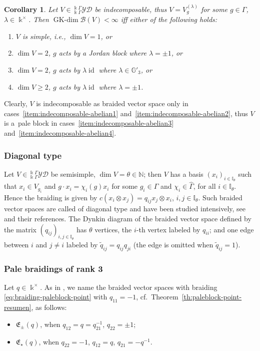 \documentclass[pdftex]{sigma}
\numberwithin{equation}{section}
\newtheorem{Corollary}[Theorem]{Corollary}
\newcommand{\GK}{\operatorname{GK-dim}}
\newcommand{\id}{\operatorname{id}}
\newcommand{\toba}{\mathscr B}
\newcommand{\G}{{\mathbb G}}
\newcommand{\I}{{\mathbb I}}
\newcommand{\N}{{\mathbb N}}
\newcommand{\eny}{\mathfrak{E}}
\newcommand{\yd}[1]{{}_{#1}^{#1}\mathcal{YD}}
\newcommand{\VGamma}{\widehat{\Gamma}}
\begin{document}
\begin{Corollary}\label{coro:indecomposable-abelian}
Let $V \in \yd{\Bbbk\Gamma}$ be indecomposable, thus $V = V_{g}^{(\lambda)}$
for some $g\in \Gamma$, $\lambda\in \Bbbk^{\times}$. Then $\GK\toba(V) <\infty$
iff either of the following holds:
\begin{enumerate}[label=$(\alph*)$]\itemsep=0pt
\item\label{item:indecomposable-abelian1} $V$ is simple, i.e., $\dim V = 1$, or

\item\label{item:indecomposable-abelian2} $\dim V = 2$, $g$ acts by a Jordan block where $\lambda = \pm 1$, or

\item\label{item:indecomposable-abelian3} $\dim V = 2$, $g$ acts by $\lambda \id$ where $\lambda \in \G'_3$, or

\item\label{item:indecomposable-abelian4} $\dim V \geq 2$, $g$ acts by $\lambda \id$ where $\lambda = \pm 1$.
\end{enumerate}
\end{Corollary}
Clearly, $V$ is indecomposable as braided vector space only in cases~\ref{item:indecomposable-abelian1}
and~\ref{item:indecomposable-abelian2}, thus $V$ is a~pale block in cases~\ref{item:indecomposable-abelian3}
and~\ref{item:indecomposable-abelian4}.

\subsubsection{Diagonal type}\label{subsec:diagonal-type} Let $V \in \yd{\Bbbk\Gamma}$ be semisimple, $\dim V = \theta \in \N$; then
$V$ has a basis $(x_i)_{i\in \I_{\theta}}$ such that $x_i\in V_{g_i}$ and $g\cdot x_i = \chi_i(g) x_i$ for some $g_i\in \Gamma$
and $\chi_i\in \VGamma$, for all $i\in \I_{\theta}$. Hence the braiding is given by $c(x_i\otimes x_j) = q_{ij} x_j \otimes x_i$,
$i, j\in \I_{\theta}$. Such braided vector spaces are called of diagonal type and have been studied intensively, see
\cite{A-leyva,AA-diag-survey,AS,H-classif-RS} and their references.
The Dynkin diagram of the braided vector space defined by the matrix $(q_{ij})_{i, j\in \I_{\theta}}$ has $\theta$ vertices, the $i$-th
vertex labeled by $q_{ii}$; and one edge between $i$ and $j \neq i$ labeled by $\widetilde{q}_{ij} = q_{ij}q_{ji}$
(the edge is omitted when $\widetilde{q}_{ij} = 1$).


\subsubsection{Pale braidings of rank 3}%
Let $q\in \Bbbk^{\times}$. As in \cite{AAH-triang},
we name the braided vector spaces with braiding \eqref{eq:braiding-paleblock-point}
with $q_{11}= -1$, cf.~Theorem~\ref{th:paleblock-point-resumen}, as follows:
\begin{itemize}\itemsep=0pt
\item $\eny_{\pm}(q)$, when $q_{12} = q = q_{21}^{-1}$, $q_{22} = \pm 1$;
\item $\eny_{\star}(q)$, when $q_{22}=-1$, $q_{12}=q$, $q_{21}=-q^{-1}$.
\end{itemize}
\end{document}
